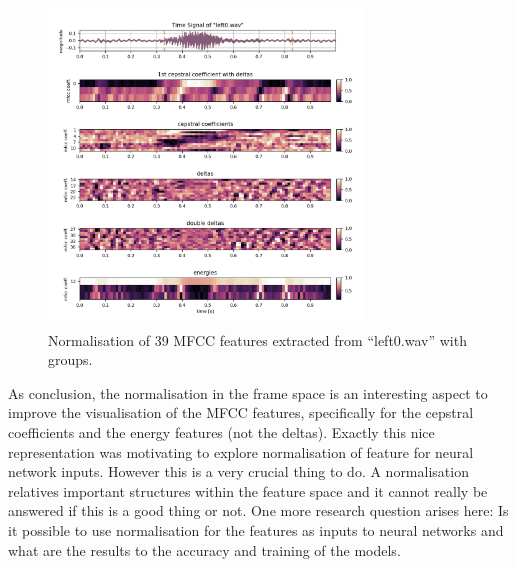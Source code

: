 \begin{figure}[!ht]
  \centering
    \includegraphics[width=0.75\textwidth]{./3_signal/figs/signal_mfcc_left0_order_norm1.png}
  \caption{Normalisation of 39 MFCC features extracted from \enquote{left0.wav} with groups.}
  \label{fig:left0_order_norm1}
\end{figure}
\FloatBarrier
\noindent
As conclusion, the normalisation in the frame space is an interesting aspect to improve the visualisation of the MFCC features, 
specifically for the cepstral coefficients and the energy features (not the deltas).
Exactly this nice representation was motivating to explore normalisation of feature for neural network inputs.
However this is a very crucial thing to do. A normalisation relatives important structures within the feature space and it cannot really be answered if this is a good thing or not.
One more research question arises here: Is it possible to use normalisation for the features as inputs to neural networks and what are the results to the accuracy and training of the models.
